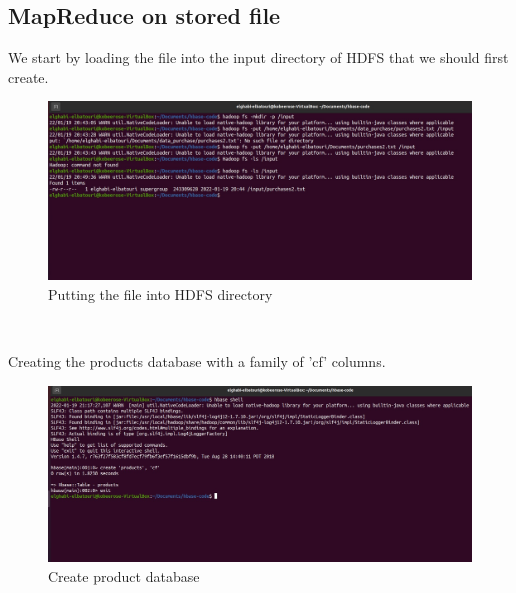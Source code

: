 \begin{spacing}{1.2}
\section{MapReduce on stored file }
\par We start by loading the file into the input directory of HDFS that we should first create.
\\
\begin{figure}[!htb] 
\begin{center} 
\includegraphics[width=1\linewidth]{Pictures/HBase/Using the HBase Java API/MapReduce on stored file/Putting the file into HDFS directory} 
\end{center} 
\caption{Putting the file into HDFS directory} 
\end{figure}  \FloatBarrier
\\
\newpage
\par Creating the products database with a family of 'cf' columns.
\\
\begin{figure}[!htb] 
\begin{center} 
\includegraphics[width=1\linewidth]{Pictures/HBase/Using the HBase Java API/MapReduce on stored file/Create product database} 
\end{center} 
\caption{Create product database} 
\end{figure}  \FloatBarrier
\\


\end{spacing}
